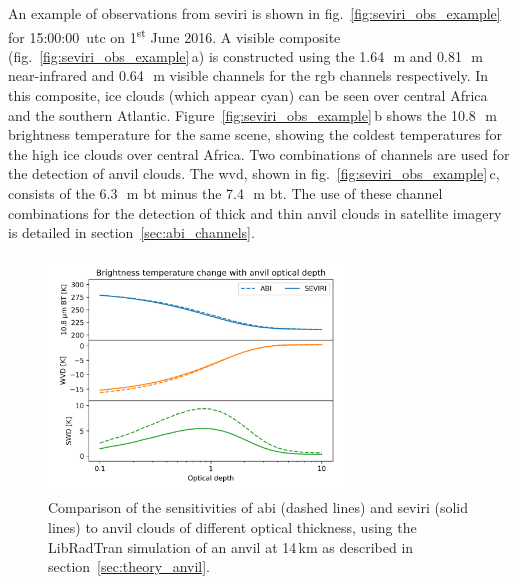 An example of observations from \acrshort{seviri} is shown in fig.~\ref{fig:seviri_obs_example} for 15:00:00~\acrshort{utc} on 1\textsuperscript{st} June 2016. 
A visible composite (fig.~\ref{fig:seviri_obs_example}\,a) is constructed using the 1.64\,\unit{\mu m} and 0.81\,\unit{\mu m} near-infrared and 0.64\,\unit{\mu m} visible channels for the \acrshort{rgb} channels respectively. 
In this composite, ice clouds (which appear cyan) can be seen over central Africa and the southern Atlantic. 
Figure~\ref{fig:seviri_obs_example}\,b shows the 10.8\,\unit{\mu m} brightness temperature for the same scene, showing the coldest temperatures for the high ice clouds over central Africa. 
Two combinations of channels are used for the detection of anvil clouds. 
The \acrshort{wvd}, shown in fig.~\ref{fig:seviri_obs_example}\,c, consists of the 6.3\,\unit{\mu m} \acrshort{bt} minus the 7.4\,\unit{\mu m} \acrshort{bt}. 
The use of these channel combinations for the detection of thick and thin anvil clouds in satellite imagery is detailed in section~\ref{sec:abi_channels}.


\begin{figure}[tp]
    \centering
    \includegraphics[width=0.7\textwidth]{figures/chapter4_06.png}
    \caption[
    Comparison of the sensitivities of \acrshort{abi} (dashed lines) and \acrshort{seviri} (solid lines) to anvil clouds of different optical thickness
    ]{
    Comparison of the sensitivities of \acrshort{abi} (dashed lines) and \acrshort{seviri} (solid lines) to anvil clouds of different optical thickness, using the LibRadTran simulation of an anvil at 14\,\unit{km} as described in section~\ref{sec:theory_anvil}.
    }
    \label{fig:S_abi_seviri_anvil_sensitivity}
\end{figure}



